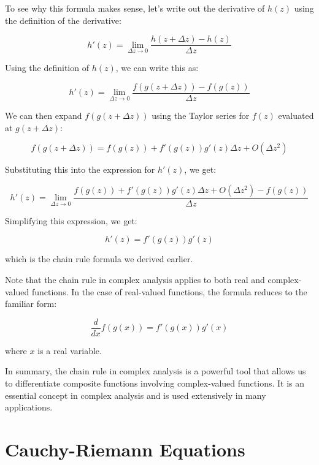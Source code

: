 \documentclass[12pt,openany]{book}
\theoremstyle{definition}
\begin{document}
	To see why this formula makes sense, let's write out the derivative of $h(z)$ using the definition of the derivative:
	
	$$h'(z) = \lim_{\Delta z \to 0} \frac{h(z + \Delta z) - h(z)}{\Delta z}$$
	
	Using the definition of $h(z)$, we can write this as:
	
	$$h'(z) = \lim_{\Delta z \to 0} \frac{f(g(z + \Delta z)) - f(g(z))}{\Delta z}$$
	
	We can then expand $f(g(z + \Delta z))$ using the Taylor series for $f(z)$ evaluated at $g(z + \Delta z)$:
	
	$$f(g(z + \Delta z)) = f(g(z)) + f'(g(z)) g'(z) \Delta z + O(\Delta z^2)$$
	
	Substituting this into the expression for $h'(z)$, we get:
	
	$$h'(z) = \lim_{\Delta z \to 0} \frac{f(g(z)) + f'(g(z)) g'(z) \Delta z + O(\Delta z^2) - f(g(z))}{\Delta z}$$
	
	Simplifying this expression, we get:
	
	$$h'(z) = f'(g(z)) g'(z)$$
	
	which is the chain rule formula we derived earlier.
	
	Note that the chain rule in complex analysis applies to both real and complex-valued functions. In the case of real-valued functions, the formula reduces to the familiar form:
	
	$$\frac{d}{dx} f(g(x)) = f'(g(x)) g'(x)$$
	
	where $x$ is a real variable.
	
	In summary, the chain rule in complex analysis is a powerful tool that allows us to differentiate composite functions involving complex-valued functions. It is an essential concept in complex analysis and is used extensively in many applications.
	
	\newpage
	\section{Cauchy-Riemann Equations}
	
\end{document}
